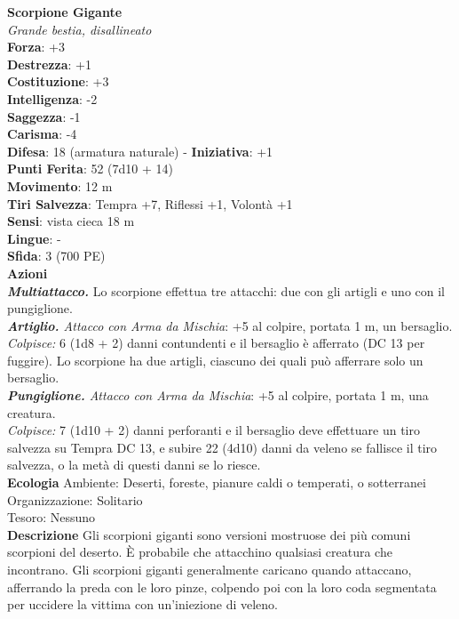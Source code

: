 \begin{multicols}{2}
\medskip\textbf{Scorpione Gigante}\\
\emph{Grande bestia, disallineato}\\
\textbf{Forza}: +3\\
\textbf{Destrezza}: +1\\
\textbf{Costituzione}: +3\\
\textbf{Intelligenza}: -2\\
\textbf{Saggezza}: -1\\
\textbf{Carisma}: -4\\
\textbf{Difesa}: 18 (armatura naturale) - \textbf{Iniziativa}: +1\\
\textbf{Punti Ferita}: 52 (7d10 + 14)\\
\textbf{Movimento}: 12 m\\
\textbf{Tiri Salvezza}: Tempra +7, Riflessi +1, Volontà +1\\
\textbf{Sensi}: vista cieca 18 m\\
\textbf{Lingue}: -\\
\textbf{Sfida}: 3 (700 PE)\smallskip\\
\smallskip\textbf{Azioni}\\
\emph{\textbf{Multiattacco.}} Lo scorpione effettua tre attacchi: due con gli artigli e uno con il pungiglione.\\
\emph{\textbf{Artiglio.} Attacco con Arma da Mischia}: +5 al colpire, portata 1 m, un bersaglio.\\
\emph{Colpisce:} 6 (1d8 + 2) danni contundenti e il bersaglio è afferrato (DC  13 per fuggire). Lo scorpione ha due artigli, ciascuno dei quali può afferrare solo un bersaglio.\\
\emph{\textbf{Pungiglione.} Attacco con Arma da Mischia}: +5 al colpire, portata 1 m, una creatura.\\
\emph{Colpisce:} 7 (1d10 + 2) danni perforanti e il bersaglio deve effettuare un tiro salvezza su Tempra DC  13, e subire 22 (4d10) danni da veleno se fallisce il tiro salvezza, o la metà di questi danni se lo riesce.\\
\textbf{Ecologia}
Ambiente: Deserti, foreste, pianure caldi o temperati, o sotterranei\\
Organizzazione: Solitario\\
Tesoro: Nessuno\\
\textbf{Descrizione}
Gli scorpioni giganti sono versioni mostruose dei più comuni scorpioni del deserto. È probabile che attacchino qualsiasi creatura che incontrano. Gli scorpioni giganti generalmente caricano quando attaccano, afferrando la preda con le loro pinze, colpendo poi con la loro coda segmentata per uccidere la vittima con un'iniezione di veleno.\\


\end{multicols}
